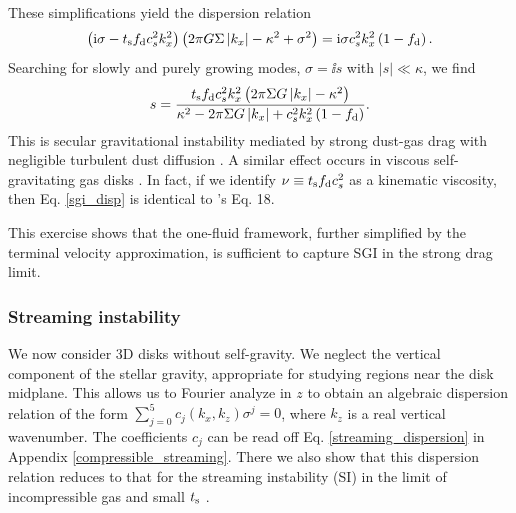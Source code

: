 These simplifications yield the dispersion relation
\begin{align*}
  \left(\mathrm{i}\sigma - t_\mathrm{s}f_\mathrm{d} c_s^2k_x^2\right)\left( 2 \pi G
    \Sigma \left|k_x\right|  - \kappa^2 + \sigma^2 \right) = \mathrm{i}
  \sigma c_s^2 k_x^2\left(1 - f_\mathrm{d}\right). 
\end{align*}
Searching for slowly and purely growing modes, $\sigma = \ii s$ with 
$|s|\ll \kappa$, we find 
\begin{align}  
s = \frac{t_\mathrm{s}f_\mathrm{d} c_s^2 k_x^2 \left( 2 \pi \Sigma G
    \left|k_x\right| - \kappa^2\right)}{\kappa^2 -2 \pi \Sigma G
    \left|k_x\right| + c_s^2k_x^2\left(1-f_\mathrm{d}\right) }. \label{sgi_disp}
\end{align}
This is secular gravitational instability mediated by strong
dust-gas drag with negligible turbulent dust diffusion 
\citep[][ their Eq. 13 becomes our Eq. \ref{sgi_disp} in this limit
after 
a change of variables]{takahashi14}. A similar effect occurs in viscous
self-gravitating gas disks \citep{gammie96,lin16}. In fact, if we
identify $\nu \equiv t_\mathrm{s} f_\mathrm{d} c_s^2$ as a kinematic viscosity,
then Eq. \ref{sgi_disp} is identical to \citeauthor{gammie96}'s Eq. 18. 

This exercise shows that the one-fluid framework, further simplified by
the terminal velocity approximation, is sufficient to capture SGI
in the strong drag limit. 

\subsubsection{Streaming instability}\label{si}
We now consider 3D disks without self-gravity. We neglect the vertical     
component of the stellar gravity, appropriate for studying regions
near the disk midplane. This  
allows us to Fourier analyze in $z$ to obtain 
an algebraic dispersion relation of the form  
$\sum_{j=0}^{5}c_j(k_x,k_z)\sigma^j = 0$, where $k_z$ is a real
vertical wavenumber. The coefficients $c_j$ can be read 
off Eq. \ref{streaming_dispersion} in  Appendix \ref{compressible_streaming}. 
There we also show that this dispersion relation reduces to that for
the streaming instability (SI) in the limit of incompressible gas and small
$t_\mathrm{s}$ \citep{youdin05a,jacquet11}.   
 

